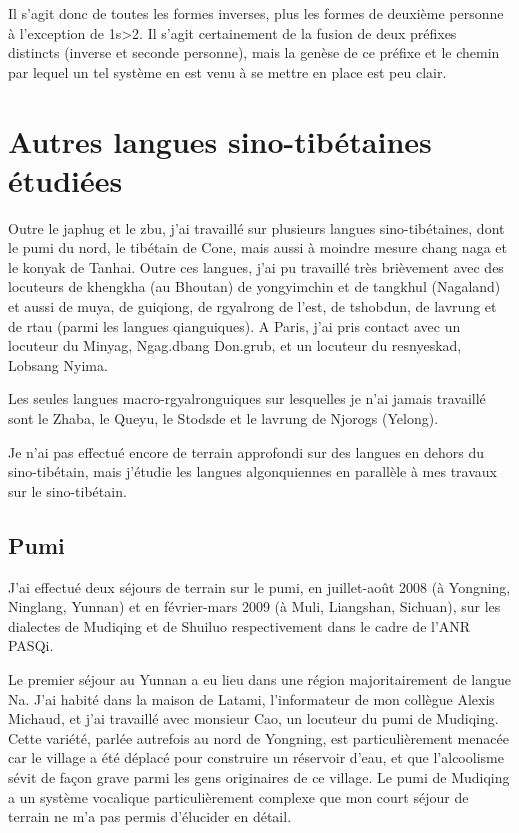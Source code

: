 \documentclass[oldfontcommands,oneside,a4paper,11pt]{memoir}
\begin{document}
Il s'agit donc de toutes les formes inverses, plus les formes de deuxième personne à l'exception de 1s>2. Il s'agit certainement de la fusion de deux préfixes distincts (inverse et seconde personne), mais la genèse de ce préfixe et le chemin  par lequel un tel système en est venu à se mettre en place est peu clair.

\section{Autres langues sino-tibétaines étudiées} 
Outre le japhug et le zbu, j'ai travaillé sur plusieurs langues sino-tibétaines, dont le pumi du nord, le tibétain de Cone, mais aussi à moindre mesure chang naga et le konyak de Tanhai. Outre ces langues, j'ai pu travaillé très brièvement avec des locuteurs de khengkha (au Bhoutan) de yongyimchin et de tangkhul (Nagaland) et aussi de muya, de guiqiong, de rgyalrong de l'est, de tshobdun, de lavrung et de rtau (parmi les langues qianguiques). A Paris, j'ai pris contact avec un locuteur du Minyag, Ngag.dbang Don.grub, et un locuteur du resnyeskad, Lobsang Nyima.

Les seules langues macro-rgyalronguiques sur lesquelles je n'ai jamais travaillé sont le Zhaba, le Queyu, le Stodsde et le lavrung de Njorogs (Yelong).


Je n'ai pas effectué encore de terrain approfondi sur des langues en dehors du sino-tibétain, mais j'étudie les langues algonquiennes en parallèle à mes travaux sur le sino-tibétain.

\subsection{Pumi}
J'ai effectué deux séjours de terrain sur le pumi, en juillet-août 2008 (à Yongning, Ninglang, Yunnan) et en février-mars 2009 (à Muli, Liangshan, Sichuan), sur les dialectes de Mudiqing et de Shuiluo respectivement dans le cadre de l'ANR PASQi. 

Le premier séjour au Yunnan a eu lieu dans une région majoritairement de langue Na. J'ai habité dans la maison de Latami, l'informateur de mon collègue Alexis Michaud, et j'ai travaillé avec monsieur Cao, un locuteur du pumi de Mudiqing. Cette variété, parlée autrefois au nord de Yongning, est particulièrement menacée car le village a été déplacé pour construire un réservoir d'eau, et que l'alcoolisme sévit de façon grave parmi les gens originaires de ce village. Le pumi de Mudiqing a un système vocalique particulièrement complexe que mon court séjour de terrain ne m'a pas permis d'élucider en détail.
\end{document}
